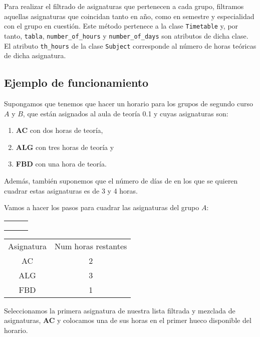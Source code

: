 Para realizar el filtrado de asignaturas que pertenecen a cada grupo, filtramos aquellas asignaturas que coincidan tanto en año, como en semestre y especialidad con el grupo en cuestión. Este método pertenece a la clase \texttt{Timetable} y, por tanto, \texttt{tabla}, \texttt{number\_of\_hours} y \texttt{number\_of\_days} son atributos de dicha clase. El atributo \texttt{th\_hours} de la clase \texttt{Subject} corresponde al número de horas teóricas de dicha asignatura.

\subsection{Ejemplo de funcionamiento}
Supongamos que tenemos que hacer un horario para los grupos de segundo curso $A$ y $B$, que están asignados al aula de teoría 0.1 y cuyas asignaturas son:

\begin{enumerate}[$\bullet$]
    \item \textbf{AC} con dos horas de teoría,
    \item \textbf{ALG} con tres horas de teoría y
    \item \textbf{FBD} con una hora de teoría.
\end{enumerate}

Además, también suponemos que el número de días de en los que se quieren cuadrar estas asignaturas es de 3 y 4 horas.

Vamos a hacer los pasos para cuadrar las asignaturas del grupo $A$:

\begin{minipage}{0.5\textwidth}    
\begin{tabular}{| c | c | c |}
\hline
 &  &  \\
 \hline
 &  &  \\
 \hline
 &  &  \\
 \hline
 &  &  \\
 \hline 
\end{tabular}
\end{minipage}
\begin{minipage}{0.5\textwidth}
\begin{tabular}{c | c}
Asignatura & Num horas restantes \\
AC & 2 \\
ALG & 3 \\
FBD & 1
\end{tabular}
\end{minipage}

Seleccionamos la primera asignatura de nuestra lista filtrada y mezclada de asignaturas, \textbf{AC} y colocamos una de sus horas en el primer hueco disponible del horario. 

